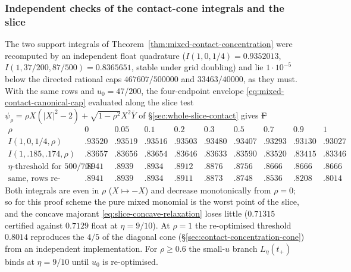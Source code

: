 \subsubsection{Independent checks of the contact-cone integrals and the slice}
The two support integrals of
Theorem~\ref{thm:mixed-contact-concentration} were recomputed by an
independent float quadrature
($I(1,0,1/4)=0.9352013$, $I(1,37/200,87/500)=0.8365651$, stable under
grid doubling) and lie $1\cdot10^{-5}$ below the directed rational caps
$467607/500000$ and $33463/40000$, as they must. With the same rows and
$u_0=47/200$, the four-endpoint envelope
\eqref{eq:mixed-contact-canonical-cap} evaluated along the slice test
$\psi_\rho=\rho X(|X|^2-2)+\sqrt{1-\rho^2}X^2\bar Y$ of
\S\ref{sec:whole-slice-contact} gives \st{F}
\[
\begin{array}{c|ccccccccc}
 \rho&0&0.05&0.1&0.2&0.3&0.5&0.7&0.9&1\\\hline
 I(1,0,1/4,\rho)&.93520&.93519&.93516&.93503&.93480&.93407&.93293&.93130&.93027\\
 I(1,.185,.174,\rho)&.83657&.83656&.83654&.83646&.83633&.83590&.83520&.83415&.83346\\
 \eta\text{-threshold for }500/701&.8941&.8939&.8934&.8912&.8876&.8756&.8666&.8666&.8666\\
 \text{same, rows re-optimised}&.8941&.8939&.8934&.8911&.8873&.8748&.8536&.8208&.8014
\end{array}
\]
Both integrals are even in $\rho$ ($X\mapsto-X$) and decrease
monotonically from $\rho=0$; so for this proof scheme the pure mixed
monomial is the worst point of the slice, and the concave majorant
\eqref{eq:slice-concave-relaxation} loses little
($0.71315$ certified against $0.7129$ float at $\eta=9/10$). At $\rho=1$
the re-optimised threshold $0.8014$ reproduces the $4/5$ of the diagonal
cone (\S\ref{sec:contact-concentration-cone}) from an independent
implementation. For $\rho\ge0.6$ the small-$u$ branch $L_\eta(t_+)$
binds at $\eta=9/10$ until $u_0$ is re-optimised.

